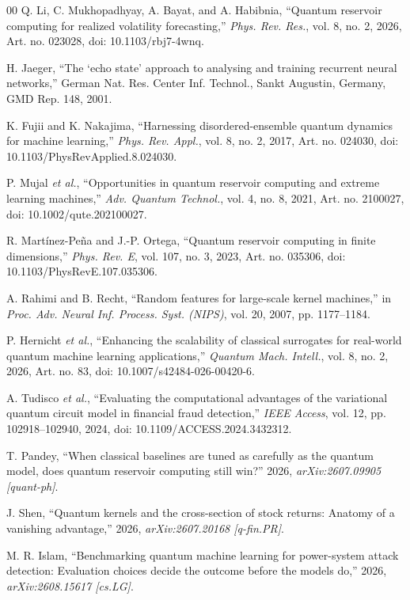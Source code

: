 \documentclass{ieeeaccess}
\begin{document}
\begin{thebibliography}{00}
Q. Li, C. Mukhopadhyay, A. Bayat, and A. Habibnia, ``Quantum reservoir computing for realized volatility forecasting,'' \emph{Phys. Rev. Res.}, vol. 8, no. 2, 2026, Art. no. 023028, doi: 10.1103/rbj7-4wnq.

H. Jaeger, ``The `echo state' approach to analysing and training recurrent neural networks,'' German Nat. Res. Center Inf. Technol., Sankt Augustin, Germany, GMD Rep. 148, 2001.

K. Fujii and K. Nakajima, ``Harnessing disordered-ensemble quantum dynamics for machine learning,'' \emph{Phys. Rev. Appl.}, vol. 8, no. 2, 2017, Art. no. 024030, doi: 10.1103/PhysRevApplied.8.024030.

P. Mujal \emph{et al.}, ``Opportunities in quantum reservoir computing and extreme learning machines,'' \emph{Adv. Quantum Technol.}, vol. 4, no. 8, 2021, Art. no. 2100027, doi: 10.1002/qute.202100027.

R. Mart\'inez-Pe\~na and J.-P. Ortega, ``Quantum reservoir computing in finite dimensions,'' \emph{Phys. Rev. E}, vol. 107, no. 3, 2023, Art. no. 035306, doi: 10.1103/PhysRevE.107.035306.

A. Rahimi and B. Recht, ``Random features for large-scale kernel machines,'' in \emph{Proc. Adv. Neural Inf. Process. Syst. (NIPS)}, vol. 20, 2007, pp. 1177--1184.

P. Hernicht \emph{et al.}, ``Enhancing the scalability of classical surrogates for real-world quantum machine learning applications,'' \emph{Quantum Mach. Intell.}, vol. 8, no. 2, 2026, Art. no. 83, doi: 10.1007/s42484-026-00420-6.

A. Tudisco \emph{et al.}, ``Evaluating the computational advantages of the variational quantum circuit model in financial fraud detection,'' \emph{IEEE Access}, vol. 12, pp. 102918--102940, 2024, doi: 10.1109/ACCESS.2024.3432312.

T. Pandey, ``When classical baselines are tuned as carefully as the quantum model, does quantum reservoir computing still win?'' 2026, \emph{arXiv:2607.09905 [quant-ph]}.

J. Shen, ``Quantum kernels and the cross-section of stock returns: Anatomy of a vanishing advantage,'' 2026, \emph{arXiv:2607.20168 [q-fin.PR]}.

M. R. Islam, ``Benchmarking quantum machine learning for power-system attack detection: Evaluation choices decide the outcome before the models do,'' 2026, \emph{arXiv:2608.15617 [cs.LG]}.


\end{thebibliography}
\end{document}
